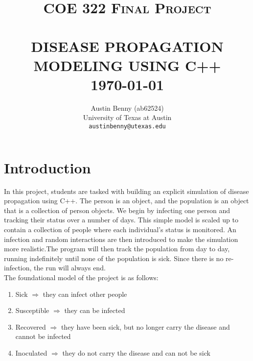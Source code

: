 \documentclass[paper=a4, fontsize=11pt]{scrartcl}
\title{	\normalsize \textsc{COE 322 Final Project} 	%
		 	\\[2.0cm]								%
			\HRule{0.5pt} \\						%
			\LARGE \textbf{\uppercase{Disease Propagation Modeling using C++}}	%
			\HRule{2pt} \\ [0.5cm]		%
			\normalsize \today			%
		}
\author{
		Austin Benny (ab62524)\\	
		University of Texas at Austin \\	
        \texttt{austinbenny@utexas.edu} \\
}
\makeatletter
\def\printtitle{%
    {\centering \@title\par}}
\def\printauthor{%
    {\centering \large \@author}}
\makeatother
\begin{document}
\thispagestyle{empty}		%

\printtitle					%
  	\vfill
\printauthor				%
\newpage
\setcounter{page}{1}		%


\tableofcontents
\newpage

\section{Introduction}

In this project, students are tasked with building an explicit simulation of disease propagation using C++. The person is an object, and the population is an object that is a collection of person objects. We begin by infecting one person and tracking their status over a number of days. This simple model is scaled up to contain a collection of people where each individual's status is monitored. An infection and random interactions are then introduced to make the simulation more realistic.The program will then track the population from day to day, running indefinitely until none of the population is sick. Since there is no re-infection, the run will always end.\\

The foundational model of the project is as follows:\\
\begin{enumerate}
	\item Sick $\Rightarrow$ they can infect other people
	\item Susceptible $\Rightarrow$ they can be infected
	\item Recovered $\Rightarrow$ they have been sick, but no longer carry the disease and cannot be infected
	\item Inoculated $\Rightarrow$ they do not carry the disease and can not be sick
\end{enumerate}
\end{document}
